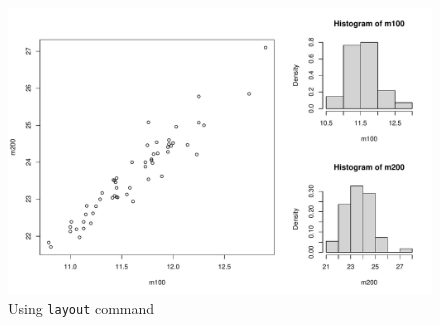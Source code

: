 \documentclass[a4paper]{article}
\begin{document}
    \begin{figure}[!htp]
        \centering
        \includegraphics[width=\textwidth]{img/example-analysis-of-quantitative-data-4.pdf}
        \caption*{Using \texttt{layout} command}
    \end{figure}

    \newpage
\end{document}
